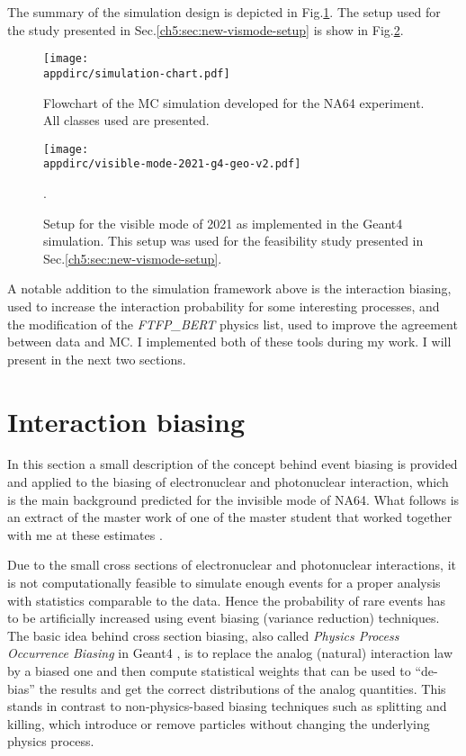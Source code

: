The summary of the simulation design is depicted in Fig.\ref{fig:sim-chart}. The setup used for the study presented in Sec.\ref{ch5:sec:new-vismode-setup} is show in Fig.\ref{fig:setup-2021-g4}.

\begin{figure}[tbh!]
    \centering
    \texttt{[image: \\appdirc/simulation-chart.pdf]}
    \caption{Flowchart of the MC simulation developed for the NA64 experiment. All classes used are presented.}
    \label{fig:sim-chart}
\end{figure}

\begin{figure}[bth!]
    \centering
    \texttt{[image: \\appdirc/visible-mode-2021-g4-geo-v2.pdf]}
    \caption{Setup for the visible mode of 2021 as implemented in the Geant4 simulation. This setup was used for the feasibility study presented in Sec.\ref{ch5:sec:new-vismode-setup}.}.
    \label{fig:setup-2021-g4}
\end{figure}

A notable addition to the simulation framework above is the interaction biasing, used to increase the interaction probability for some interesting processes, and the modification of the \textit{FTFP\_BERT} physics list, used to improve the agreement between data and MC. I implemented both of these tools during my work. I will present in the next two sections.

\FloatBarrier\noindent
\section{Interaction biasing}
\label{appC:sec:physics-list}

In this section a small description of the concept behind event biasing is provided and applied to the biasing of electronuclear and photonuclear interaction, which is the main background predicted for the invisible mode of NA64. What follows is an extract of the master work of one of the master student that worked together with me at these estimates \cite{pdegen-thesis}.

Due to the small cross sections of electronuclear and photonuclear interactions, it is not computationally feasible to simulate enough events for a proper analysis with statistics comparable to the data. Hence the probability of rare events has to be artificially increased using event biasing (variance reduction) techniques. The basic idea behind cross section biasing, also called \textit{Physics Process Occurrence Biasing} in Geant4 \cite{G4bias}, is to replace the analog (natural) interaction law by a biased one and then compute statistical weights that can be used to ``de-bias'' the results and get the correct distributions of the analog quantities. This stands in contrast to non-physics-based biasing techniques such as splitting and killing, which introduce or remove particles without changing the underlying physics process.

